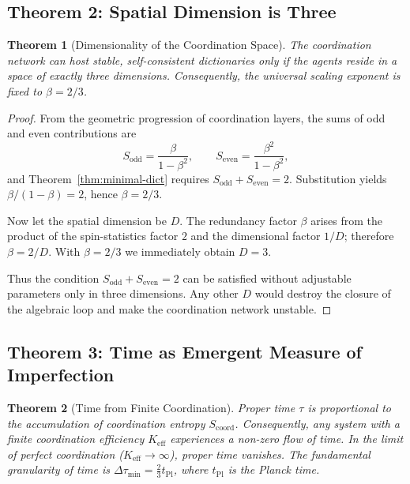 \documentclass[12pt,a4paper]{article}
\newtheorem{theorem}{Theorem}[section]
\theoremstyle{remark}
\newcommand{\tPl}{t_{\mathrm{Pl}}}
\newcommand{\Scoord}{S_{\mathrm{coord}}}
\begin{document}
	\subsection{Theorem 2: Spatial Dimension is Three}
	
	\begin{theorem}[Dimensionality of the Coordination Space]
		\label{thm:dimension}
		The coordination network can host stable, self-consistent dictionaries only
		if the agents reside in a space of exactly three dimensions.  Consequently,
		the universal scaling exponent is fixed to \(\beta = 2/3\).
	\end{theorem}
	
	\begin{proof}
		From the geometric progression of coordination layers, the sums of odd
		and even contributions are
		\[
		S_{\mathrm{odd}} = \frac{\beta}{1-\beta^2}, \qquad
		S_{\mathrm{even}} = \frac{\beta^2}{1-\beta^2},
		\]
		and Theorem~\ref{thm:minimal-dict} requires
		\(S_{\mathrm{odd}} + S_{\mathrm{even}} = 2\).
		Substitution yields \(\beta/(1-\beta) = 2\), hence \(\beta = 2/3\).
		
		Now let the spatial dimension be \(D\).  The redundancy factor \(\beta\)
		arises from the product of the spin-statistics factor \(2\) and the
		dimensional factor \(1/D\); therefore \(\beta = 2/D\).  With \(\beta = 2/3\)
		we immediately obtain \(D = 3\).
		
		Thus the condition \(S_{\mathrm{odd}} + S_{\mathrm{even}} = 2\) can be
		satisfied without adjustable parameters only in three dimensions.  Any
		other \(D\) would destroy the closure of the algebraic loop and make the
		coordination network unstable.
	\end{proof}
	
	\subsection{Theorem 3: Time as Emergent Measure of Imperfection}
	
	\begin{theorem}[Time from Finite Coordination]
		\label{thm:time}
		Proper time \(\tau\) is proportional to the accumulation of coordination
		entropy \(\Scoord\).  Consequently, any system with a finite coordination
		efficiency \(K_{\mathrm{eff}}\) experiences a non-zero flow of time.  In the
		limit of perfect coordination (\(K_{\mathrm{eff}} \to \infty\)), proper time
		vanishes.  The fundamental granularity of time is
		\(\Delta \tau_{\min} = \frac{2}{3} \tPl\), where \(\tPl\) is the Planck time.
	\end{theorem}
	
\end{document}
